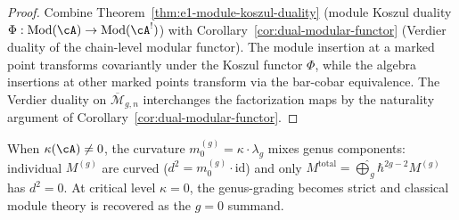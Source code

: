\begin{proof}
Combine Theorem~\ref{thm:e1-module-koszul-duality} (module Koszul
duality $\Phi: \mathrm{Mod}(\cA) \to \mathrm{Mod}(\cA^!)$)
with Corollary~\ref{cor:dual-modular-functor} (Verdier duality of
the chain-level modular functor).  The module insertion at a marked
point transforms covariantly under the Koszul functor $\Phi$,
while the algebra insertions at other marked points transform via
the bar-cobar equivalence.  The Verdier duality on
$\overline{\mathcal{M}}_{g,n}$ interchanges the factorization
maps by the naturality argument of
Corollary~\ref{cor:dual-modular-functor}.
\end{proof}

\begin{remark}
\label{rem:curvature-genus-obstruction}
When $\kappa(\cA) \neq 0$, the curvature $m_0^{(g)} = \kappa \cdot \lambda_g$ mixes genus components: individual $M^{(g)}$ are curved ($d^2 = m_0^{(g)} \cdot \mathrm{id}$) and only $M^{\mathrm{total}} = \widehat{\bigoplus}_g \hbar^{2g-2} M^{(g)}$ has $d^2 = 0$.  At critical level $\kappa = 0$, the genus-grading becomes strict and classical module theory is recovered as the $g = 0$ summand.
\end{remark}

